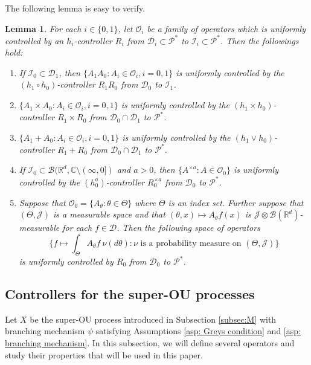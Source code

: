 \documentclass[12pt,a4paper]{amsart}
\theoremstyle{plain}
\newtheorem{lem}[thm]{Lemma}
\theoremstyle{definition}
\numberwithin{equation}{section}
\begin{document}
The following lemma is easy to verify.
\begin{lem}
  \label{lem: property of controllable operators}
  For each $i \in \{0,1\}$, let $\mathscr O_i$ be a family of operators which is  uniformly controlled by an $h_i$-controller $R_i$ from $\mathcal D_i \subset \mathcal P^*$ to $ \mathcal I_i \subset \mathcal P^*$.
  Then the followings hold:
  \begin{enumerate}
  \item
    If $\mathcal I_0 \subset \mathcal D_1$, then $\{A_1A_0: A_i \in \mathscr O_i, i = 0,1\}$ is uniformly controlled by the $(h_1 \circ h_0)$-controller $R_1R_0$ from $\mathcal D_0$ to $\mathcal I_1$.
  \item
    $\{ A_1 \times A_0: A_i \in \mathscr O_i, i = 0,1\}$ is uniformly controlled by the $(h_1\times h_0)$-controller $R_1 \times R_0$ from $\mathcal D_0 \cap \mathcal D_1$ to $\mathcal P^*$.
  \item
    $\{ A_1 + A_0: A_i \in \mathscr O_i, i = 0,1\}$ is uniformly controlled by the $(h_1 \vee h_0)$-controller $R_1 + R_0$ from $\mathcal D_0 \cap \mathcal D_1$ to $\mathcal P^*$.
\item
    If $\mathcal I_0 \subset \mathcal B(\mathbb R^d, \mathbb C \setminus (\infty, 0])$ and $a>0$, then $\{A^{\times a} : A \in \mathscr O_0\}$ is uniformly controlled by the $(h_0^a)$-controller $R_0^{\times a}$ from $\mathcal D_0$ to $\mathcal P^*$.
  \item
    Suppose that $\mathscr O_0 = \{A_\theta: \theta \in \Theta \}$ where $\Theta$ is an index set.
    Further suppose that $(\Theta, \mathcal J )$ is a measurable space and that $(\theta,x) \mapsto A_\theta f(x)$ is $\mathcal J \otimes \mathcal B(\mathbb R^d)$-measurable for each $f\in \mathcal D$.
    Then the following space of operators
    \[
      \Big\{ f \mapsto \int_{\Theta} A_\theta f~\nu(d\theta) : \nu \text{ is a probability measure on } (\Theta, \mathcal J) \Big\}
    \]
    is uniformly controlled by $R_0$ from $\mathcal D_0$ to $\mathcal P^*$.
\end{enumerate}
\end{lem}



\subsection{Controllers for the super-OU processes}
\label{sec: h-controller}
Let $X$ be the super-OU process introduced in Subsection \ref{subsec:M} with branching mechanism $\psi$ satisfying
Assumptions \ref{asp: Greys condition} and \ref{asp: branching mechanism}.
In this subsection, we will define several operators and study their properties that will be used in this paper.
\end{document}
